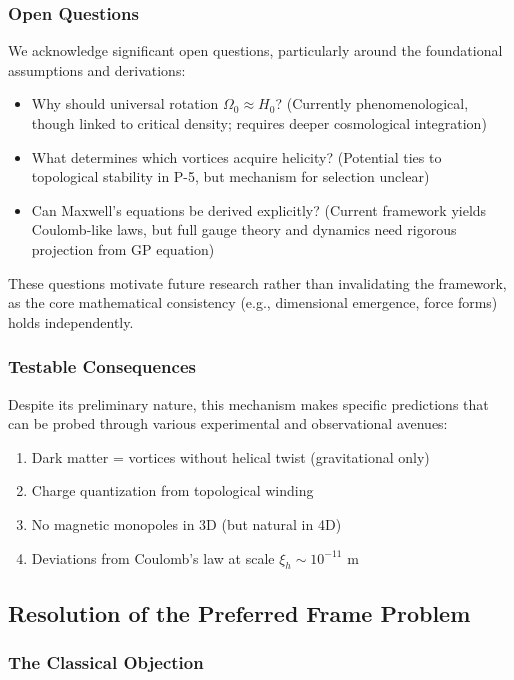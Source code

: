 \subsubsection{Open Questions}
We acknowledge significant open questions, particularly around the foundational assumptions and derivations:
\begin{itemize}
\item Why should universal rotation $\Omega_0 \approx H_0$? (Currently phenomenological, though linked to critical density; requires deeper cosmological integration)
\item What determines which vortices acquire helicity? (Potential ties to topological stability in P-5, but mechanism for selection unclear)
\item Can Maxwell's equations be derived explicitly? (Current framework yields Coulomb-like laws, but full gauge theory and dynamics need rigorous projection from GP equation)
\end{itemize}
These questions motivate future research rather than invalidating the framework, as the core mathematical consistency (e.g., dimensional emergence, force forms) holds independently.

\subsubsection{Testable Consequences}
Despite its preliminary nature, this mechanism makes specific predictions that can be probed through various experimental and observational avenues:
\begin{enumerate}
\item Dark matter = vortices without helical twist (gravitational only)
\item Charge quantization from topological winding
\item No magnetic monopoles in 3D (but natural in 4D)
\item Deviations from Coulomb's law at scale $\xi_h \sim 10^{-11}$ m
\end{enumerate}

\subsection{Resolution of the Preferred Frame Problem}

\subsubsection{The Classical Objection}

